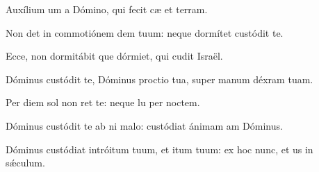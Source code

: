 \item {}

\item Auxílium um a Dómino,\psstar{} qui fecit cæ et terram.

\item Non det in commotiónem dem tuum:\psstar{} neque dormítet  custódit te.

\item Ecce, non dormitábit que dórmiet,\psstar{} qui cudit Israël.

\item Dóminus custódit te, Dóminus proctio tua,\psstar{} super manum déxram tuam.

\item Per diem sol non ret te:\psstar{} neque lu per noctem.

\item Dóminus custódit te ab ni malo:\psstar{} custódiat ánimam am Dóminus.

\item Dóminus custódiat intróitum tuum, et itum tuum:\psstar{} ex hoc nunc, et us in sǽculum.